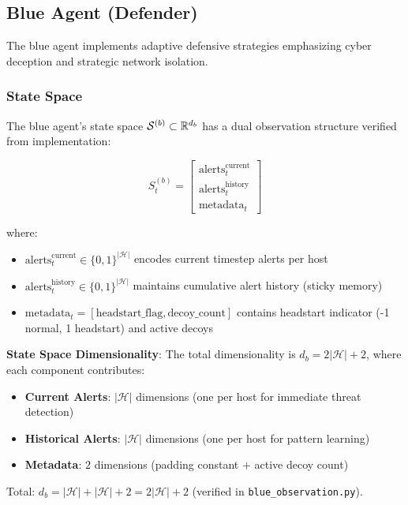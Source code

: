 \documentclass[12pt,twoside]{article}
\theoremstyle{definition}
\theoremstyle{plain}
\begin{document}
\subsection{Blue Agent (Defender)}

The blue agent implements adaptive defensive strategies emphasizing cyber deception and strategic network isolation.

\subsubsection{State Space}
The blue agent's state space $\mathcal{S}^{(b)} \subset \mathbb{R}^{d_b}$ has a dual observation structure verified from implementation:

\begin{equation}
S_t^{(b)} = \begin{bmatrix}
\text{alerts}_t^{\text{current}} \\
\text{alerts}_t^{\text{history}} \\
\text{metadata}_t
\end{bmatrix}
\end{equation}

where:
\begin{itemize}
    \item $\text{alerts}_{t}^{\text{current}} \in \{0,1\}^{|\mathcal{H}|}$ encodes current timestep alerts per host
    \item $\text{alerts}_{t}^{\text{history}} \in \{0,1\}^{|\mathcal{H}|}$ maintains cumulative alert history (sticky memory)
    \item $\text{metadata}_t = [\text{headstart\_flag}, \text{decoy\_count}]$ contains headstart indicator (-1 normal, 1 headstart) and active decoys
\end{itemize}

\textbf{State Space Dimensionality}: The total dimensionality is $d_b = 2|\mathcal{H}| + 2$, where each component contributes:

\begin{itemize}
\item \textbf{Current Alerts}: $|\mathcal{H}|$ dimensions (one per host for immediate threat detection)
\item \textbf{Historical Alerts}: $|\mathcal{H}|$ dimensions (one per host for pattern learning)
\item \textbf{Metadata}: $2$ dimensions (padding constant + active decoy count)
\end{itemize}

Total: $d_b = |\mathcal{H}| + |\mathcal{H}| + 2 = 2|\mathcal{H}| + 2$ (verified in \texttt{blue\_observation.py}).
\end{document}
